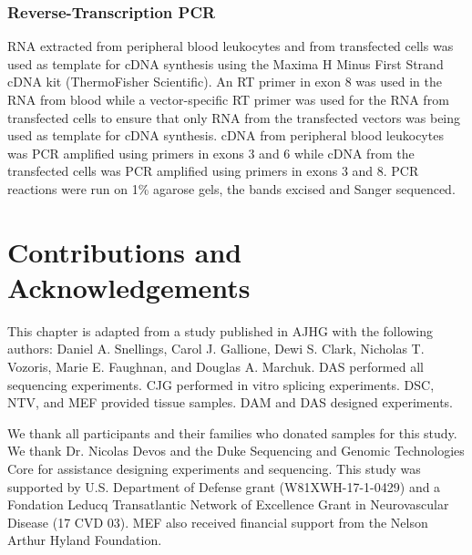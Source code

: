 \subsubsection{Reverse-Transcription PCR}
RNA extracted from peripheral blood leukocytes and from transfected cells was used as template for cDNA synthesis using the Maxima H Minus First Strand cDNA kit (ThermoFisher Scientific).  An RT primer in  exon 8 was used in the RNA from blood while a vector-specific RT primer was used for the RNA from transfected cells to ensure that only RNA from the transfected vectors was being used as template for cDNA synthesis. cDNA from peripheral blood leukocytes was PCR amplified using primers in exons 3 and 6 while cDNA from the transfected cells was PCR amplified using primers in exons 3 and 8.  PCR reactions were run on 1\% agarose gels, the bands excised and Sanger sequenced. 

\section{Contributions and Acknowledgements}
This chapter is adapted from a study published in AJHG \citep{snellings2019} with the following authors: Daniel A. Snellings, Carol J. Gallione, Dewi S. Clark, Nicholas T. Vozoris, Marie E. Faughnan, and Douglas A. Marchuk. DAS performed all sequencing experiments. CJG performed in vitro splicing experiments. DSC, NTV, and MEF provided tissue samples. DAM and DAS designed experiments. 

We thank all participants and their families who donated samples for this study. We thank Dr. Nicolas Devos and the Duke Sequencing and Genomic Technologies Core for assistance designing experiments and sequencing. This study was supported by U.S. Department of Defense grant (W81XWH-17-1-0429) and a Fondation Leducq Transatlantic Network of Excellence Grant in Neurovascular Disease (17 CVD 03). MEF also received financial support from the Nelson Arthur Hyland Foundation. 